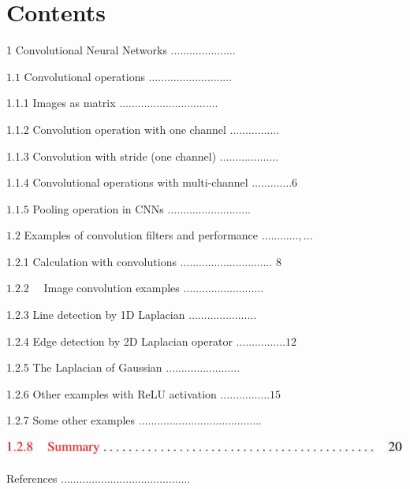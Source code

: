 \documentclass[10pt]{article}
\begin{document}
\section{Contents}
1 Convolutional Neural Networks $\ldots \ldots \ldots \ldots \ldots \ldots \ldots$

$1.1$ Convolutional operations $\ldots \ldots \ldots \ldots \ldots \ldots \ldots \ldots \ldots$

1.1.1 Images as matrix $\ldots \ldots \ldots \ldots \ldots . . . . . . . . . . . . . . . . .$

1.1.2 Convolution operation with one channel $\ldots \ldots \ldots \ldots \ldots .$

1.1.3 Convolution with stride (one channel) $\ldots \ldots \ldots \ldots \ldots \ldots .$

1.1.4 Convolutional operations with multi-channel $\ldots \ldots \ldots \ldots .6$

$1.1 .5$ Pooling operation in CNNs $\ldots \ldots . \ldots . . . . . . . . . . . . . . . . .$

$1.2$ Examples of convolution filters and performance $\ldots \ldots \ldots \ldots, \ldots$

1.2.1 Calculation with convolutions .............................. 8

$1.2 .2 \quad$ Image convolution examples $\ldots \ldots \ldots \ldots . \ldots . . . . . . . . . .$

1.2.3 Line detection by 1D Laplacian $\ldots \ldots \ldots . \ldots . . . . . . . . .$

1.2.4 Edge detection by 2D Laplacian operator $\ldots \ldots \ldots \ldots \ldots .12$

1.2.5 The Laplacian of Gaussian $\ldots \ldots \ldots \ldots . . . . . . . . . . . .$

1.2.6 Other examples with ReLU activation $\ldots \ldots \ldots \ldots \ldots .15$

1.2.7 Some other examples $\ldots \ldots \ldots \ldots \ldots \ldots \ldots . . . . . . . . . . . . . . . . . . .$

\includegraphics[max width=\textwidth]{2022_01_06_b5ce182ed1bd5f482e5bg-01}

References $\ldots \ldots \ldots \ldots \ldots \ldots \ldots \ldots \ldots \ldots \ldots \ldots \ldots \ldots$
\end{document}
